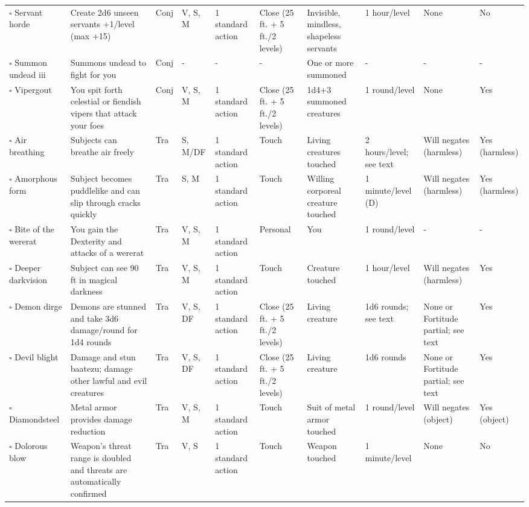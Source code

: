 \documentclass[12pt, a4paper]{article}
\begin{document}
\begin{center}
\begin{longtable}[H]{ p{8em} p{15em} p{2em} p{5em} p{6em} p{6em} p{10em} p{6em} p{5em} p{2em} }
    \(\square\) Servant horde & Create 2d6 unseen servants +1/level (max +15) & Conj & V, S, M & 1 standard action & Close (25 ft. + 5 ft./2 levels) & Invisible, mindless, shapeless servants & 1 hour/level & None & No\\
    \(\square\) Summon undead iii & Summons undead to ﬁght for you & Conj & - & - & - & One or more summoned  & - & - & -\\
    \(\square\) Vipergout & You spit forth celestial or ﬁendish vipers that attack your foes & Conj & V, S, M & 1 standard action & Close (25 ft. + 5 ft./2 levels) & 1d4+3 summoned creatures & 1 round/level & None & Yes\\
    \(\square\) Air breathing & Subjects can breathe air freely & Tra & S, M/DF & 1 standard action & Touch & Living creatures touched & 2 hours/level; see text & Will negates (harmless) & Yes (harmless)\\
    \(\square\) Amorphous form & Subject becomes puddlelike and can slip through cracks quickly & Tra & S, M & 1 standard action & Touch & Willing corporeal creature touched & 1 minute/level (D) & Will negates (harmless) & Yes (harmless)\\
    \(\square\) Bite of the wererat & You gain the Dexterity and attacks of a wererat & Tra & V, S, M & 1 standard action & Personal & You & 1 round/level & - & -\\
    \(\square\) Deeper darkvision & Subject can see 90 ft in magical darkness & Tra & V, S, M & 1 standard action & Touch & Creature touched & 1 hour/level & Will negates (harmless) & Yes \\
    \(\square\) Demon dirge & Demons are stunned and take 3d6 damage/round for 1d4 rounds & Tra & V, S, DF & 1 standard action & Close (25 ft. + 5 ft./2 levels) & Living creature & 1d6 rounds; see text & None or Fortitude partial; see text & Yes\\
    \(\square\) Devil blight & Damage and stun baatezu; damage other lawful and evil creatures & Tra & V, S, DF & 1 standard action & Close (25 ft. + 5 ft./2 levels) & Living creature & 1d6 rounds & None or Fortitude partial; see text & Yes\\
    \(\square\) Diamondsteel & Metal armor provides damage reduction & Tra & V, S, M & 1 standard action & Touch & Suit of metal armor touched & 1 round/level & Will negates (object) & Yes (object)\\
    \(\square\) Dolorous blow & Weapon’s threat range is doubled and threats are automatically conﬁrmed & Tra & V, S & 1 standard action & Touch & Weapon touched & 1 minute/level & None & No\\

\end{longtable}
\end{center}
\end{document}
